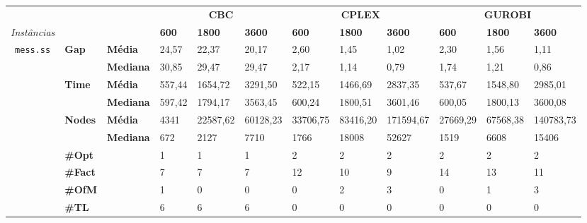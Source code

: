 
	\begin{footnotesize}	
	\caption{}
	\label{cflp:tab:4}
	\begin{tabular}{c@{\hskip 0.2cm}l@{\hskip 0.1cm}l|lll|lll|lll}
	& & & \multicolumn{3}{c}{\textbf{CBC}} & \multicolumn{3}{c}{\textbf{CPLEX}} & \multicolumn{3}{c}{\textbf{GUROBI}} 	\\\textit{Instâncias} & & & \textbf{600} & \textbf{1800} & \textbf{3600} & \textbf{600} & \textbf{1800} & \textbf{3600} & \textbf{600} & \textbf{1800} & \textbf{3600} \\
\hline
\multirow{7}{*}{\texttt{mess.ss}} & \multirow{2}{*}{\textbf{Gap}} & \textbf{Média} & 24,57 & 22,37 & 20,17 & 2,60 & 1,45 & 1,02 & 2,30 & 1,56 & 1,11 \\
 & & \textbf{Mediana} & 30,85 & 29,47 & 29,47 & 2,17 & 1,14 & 0,79 & 1,74 & 1,21 & 0,86 \\
\cline{2-12}
 & \multirow{2}{*}{\textbf{Time}} & \textbf{Média} & 557,44 & 1654,72 & 3291,50 & 522,15 & 1466,69 & 2837,35 & 537,67 & 1548,80 & 2985,01 \\
 & & \textbf{Mediana} & 597,42 & 1794,17 & 3563,45 & 600,24 & 1800,51 & 3601,46 & 600,05 & 1800,13 & 3600,08 \\
\cline{2-12}
 & \multirow{2}{*}{\textbf{Nodes}} & \textbf{Média} & 4341 & 22587,62 & 60128,23 & 33706,75 & 83416,20 & 171594,67 & 27669,29 & 67568,38 & 140783,73 \\
 & & \textbf{Mediana} & 672 & 2127 & 7710 & 1766 & 18008 & 52627 & 1519 & 6608 & 15406 \\
\cline{2-12}
 & \textbf{\#Opt} & & 1 & 1 & 1 & 2 & 2 & 2 & 2 & 2 & 2 \\
 & \textbf{\#Fact} & & 7 & 7 & 7 & 12 & 10 & 9 & 14 & 13 & 11 \\
 & \textbf{\#OfM} & & 1 & 0 & 0 & 0 & 2 & 3 & 0 & 1 & 3 \\
 & \textbf{\#TL} & & 6 & 6 & 6 & 0 & 0 & 0 & 0 & 0 & 0 \\
	\end{tabular}
	\end{footnotesize}


